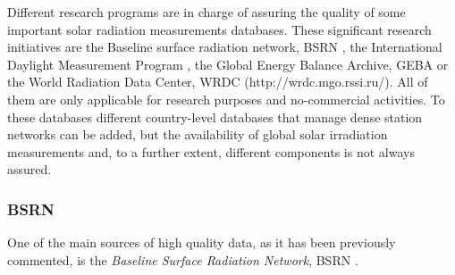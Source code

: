 Different research programs are in charge of assuring the quality of some important solar radiation measurements databases. These significant research initiatives are the Baseline surface radiation network, BSRN \cite*{Konig-Langlo2013}, the International Daylight Measurement Program \cite*{dumortier1999status}, the Global Energy Balance Archive, GEBA \cite*{Gilgen1998} or the World Radiation Data Center, WRDC (http://wrdc.mgo.rssi.ru/). All of them are only applicable for research purposes and no-commercial activities. To these databases different country-level databases that manage dense station networks can be added, but the availability of global solar irradiation measurements and, to a further extent, different components is not always assured.


\subsubsection{BSRN}

One of the main sources of high quality data, as it has been previously commented, is the \textit{Baseline Surface Radiation Network}, BSRN \cite*{Konig-Langlo2013}. %

